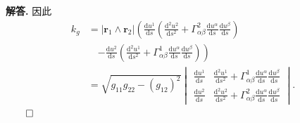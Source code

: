 \documentclass[12pt, a4paper, oneside]{ctexart}
\newenvironment{solution}{\par\noindent\textbf{解答. }}{\hfill$\qed$\par}
\begin{document}
\begin{solution}
		因此
		\begin{align*}
			k_g &= |\mathbf{r}_1 \wedge \mathbf{r}_2| \left(\frac{\mathrm{d}u^1}{\mathrm{d}s} \left(\frac{\mathrm{d}^2u^2}{\mathrm{d}s^2} + \Gamma^2_{\alpha \beta} \frac{\mathrm{d}u^\alpha}{\mathrm{d}s} \frac{\mathrm{d}u^\beta}{\mathrm{d}s}\right) \right. \nonumber \\
			&\quad \left. - \frac{\mathrm{d}u^2}{\mathrm{d}s} \left(\frac{\mathrm{d}^2u^1}{\mathrm{d}s^2} + \Gamma^1_{\alpha \beta} \frac{\mathrm{d}u^\alpha}{\mathrm{d}s} \frac{\mathrm{d}u^\beta}{\mathrm{d}s}\right)\right) \nonumber \\
			&= \sqrt{g_{11} g_{22} - (g_{12})^2} \begin{vmatrix}
				\frac{\mathrm{d}u^1}{\mathrm{d}s} & \frac{\mathrm{d}^2u^1}{\mathrm{d}s^2} + \Gamma^1_{\alpha \beta} \frac{\mathrm{d}u^\alpha}{\mathrm{d}s} \frac{\mathrm{d}u^\beta}{\mathrm{d}s} \\
				\frac{\mathrm{d}u^2}{\mathrm{d}s} & \frac{\mathrm{d}^2u^2}{\mathrm{d}s^2} + \Gamma^2_{\alpha \beta} \frac{\mathrm{d}u^\alpha}{\mathrm{d}s} \frac{\mathrm{d}u^\beta}{\mathrm{d}s}
			\end{vmatrix}.
		\end{align*}
	\end{solution}
\end{document}
